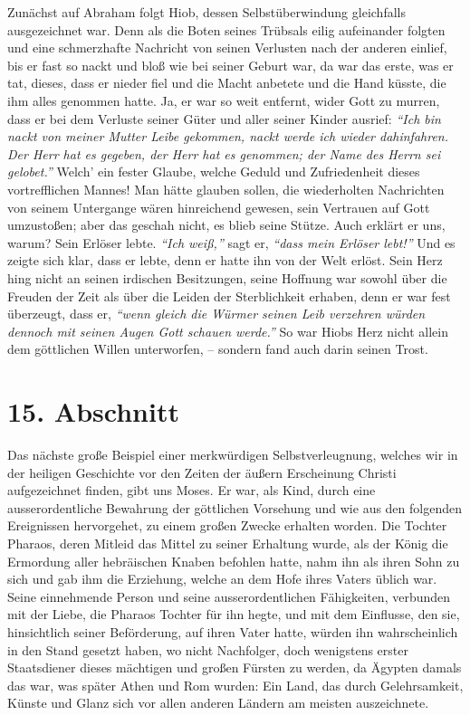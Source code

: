 Zunächst auf Abraham folgt Hiob, dessen
Selbstüberwindung gleichfalls
ausgezeichnet war. Denn als die Boten seines Trübsals eilig aufeinander
folgten und eine schmerzhafte Nachricht von seinen Verlusten nach der anderen
einlief, bis er fast so nackt und bloß wie bei seiner Geburt war, da war das
erste, was er tat, dieses, dass er nieder fiel und die Macht anbetete und die
Hand küsste, die ihm alles genommen hatte. Ja, er war so weit entfernt, wider
Gott zu murren, dass er bei dem Verluste seiner Güter und aller seiner Kinder
ausrief:
\textit{"`Ich bin nackt von meiner Mutter Leibe gekommen, nackt werde ich
wieder dahinfahren. Der Herr hat es gegeben, der Herr hat es genommen; der Name
des Herrn sei gelobet."'}
Welch' ein fester Glaube, welche
Geduld und Zufriedenheit dieses vortrefflichen Mannes! Man hätte glauben sollen,
die wiederholten Nachrichten von seinem Untergange wären hinreichend gewesen,
sein Vertrauen auf Gott umzustoßen; aber das geschah nicht, es blieb seine
Stütze. Auch erklärt er uns, warum? Sein Erlöser lebte.
\textit{"`Ich weiß,"'} sagt er,
\textit{"`dass mein Erlöser lebt!"'}
Und es zeigte sich
klar, dass er lebte, denn er hatte ihn von der Welt erlöst. Sein Herz hing
nicht an seinen irdischen Besitzungen, seine Hoffnung war sowohl über die
Freuden der Zeit als über die Leiden der Sterblichkeit erhaben, denn er war fest
überzeugt, dass er,
\textit{"`wenn gleich die Würmer seinen Leib verzehren würden
dennoch mit seinen Augen Gott schauen werde."'}
So war Hiobs
Herz nicht allein dem göttlichen Willen unterworfen, – sondern fand auch darin
seinen Trost.

\section{15. Abschnitt} \label{kap4_ab15}

Das nächste große Beispiel einer merkwürdigen
Selbstverleugnung, welches wir in
der heiligen Geschichte vor den Zeiten der äußern Erscheinung Christi
aufgezeichnet finden, gibt uns Moses. Er war, als Kind,
durch eine
ausserordentliche Bewahrung der göttlichen Vorsehung und wie aus den folgenden
Ereignissen hervorgehet, zu einem großen Zwecke erhalten worden. Die Tochter
Pharaos,
deren Mitleid das Mittel zu seiner Erhaltung wurde, als der König die
Ermordung aller hebräischen Knaben befohlen hatte, nahm ihn als ihren Sohn zu
sich und gab ihm die Erziehung, welche an dem Hofe ihres Vaters üblich war.
Seine einnehmende Person und seine ausserordentlichen Fähigkeiten, verbunden mit
der Liebe, die Pharaos Tochter für ihn hegte, und mit dem Einflusse, den sie,
hinsichtlich seiner Beförderung, auf ihren Vater hatte, würden ihn
wahrscheinlich in den Stand gesetzt haben, wo nicht Nachfolger, doch wenigstens
erster Staatsdiener dieses mächtigen und großen Fürsten zu werden, da
Ägypten damals das war, was später Athen
 und Rom wurden: Ein Land, das
durch Gelehrsamkeit, Künste und Glanz sich vor allen anderen Ländern am meisten
auszeichnete.

